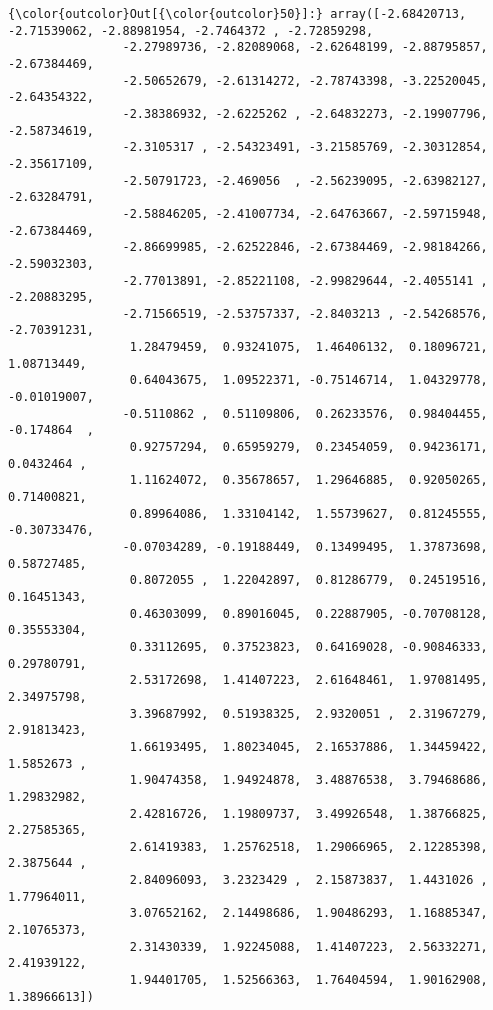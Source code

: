 \documentclass[11pt]{article}
\begin{document}
\begin{Verbatim}[commandchars=\\\{\}]
{\color{outcolor}Out[{\color{outcolor}50}]:} array([-2.68420713, -2.71539062, -2.88981954, -2.7464372 , -2.72859298,
                -2.27989736, -2.82089068, -2.62648199, -2.88795857, -2.67384469,
                -2.50652679, -2.61314272, -2.78743398, -3.22520045, -2.64354322,
                -2.38386932, -2.6225262 , -2.64832273, -2.19907796, -2.58734619,
                -2.3105317 , -2.54323491, -3.21585769, -2.30312854, -2.35617109,
                -2.50791723, -2.469056  , -2.56239095, -2.63982127, -2.63284791,
                -2.58846205, -2.41007734, -2.64763667, -2.59715948, -2.67384469,
                -2.86699985, -2.62522846, -2.67384469, -2.98184266, -2.59032303,
                -2.77013891, -2.85221108, -2.99829644, -2.4055141 , -2.20883295,
                -2.71566519, -2.53757337, -2.8403213 , -2.54268576, -2.70391231,
                 1.28479459,  0.93241075,  1.46406132,  0.18096721,  1.08713449,
                 0.64043675,  1.09522371, -0.75146714,  1.04329778, -0.01019007,
                -0.5110862 ,  0.51109806,  0.26233576,  0.98404455, -0.174864  ,
                 0.92757294,  0.65959279,  0.23454059,  0.94236171,  0.0432464 ,
                 1.11624072,  0.35678657,  1.29646885,  0.92050265,  0.71400821,
                 0.89964086,  1.33104142,  1.55739627,  0.81245555, -0.30733476,
                -0.07034289, -0.19188449,  0.13499495,  1.37873698,  0.58727485,
                 0.8072055 ,  1.22042897,  0.81286779,  0.24519516,  0.16451343,
                 0.46303099,  0.89016045,  0.22887905, -0.70708128,  0.35553304,
                 0.33112695,  0.37523823,  0.64169028, -0.90846333,  0.29780791,
                 2.53172698,  1.41407223,  2.61648461,  1.97081495,  2.34975798,
                 3.39687992,  0.51938325,  2.9320051 ,  2.31967279,  2.91813423,
                 1.66193495,  1.80234045,  2.16537886,  1.34459422,  1.5852673 ,
                 1.90474358,  1.94924878,  3.48876538,  3.79468686,  1.29832982,
                 2.42816726,  1.19809737,  3.49926548,  1.38766825,  2.27585365,
                 2.61419383,  1.25762518,  1.29066965,  2.12285398,  2.3875644 ,
                 2.84096093,  3.2323429 ,  2.15873837,  1.4431026 ,  1.77964011,
                 3.07652162,  2.14498686,  1.90486293,  1.16885347,  2.10765373,
                 2.31430339,  1.92245088,  1.41407223,  2.56332271,  2.41939122,
                 1.94401705,  1.52566363,  1.76404594,  1.90162908,  1.38966613])
\end{Verbatim}
            
\end{document}
